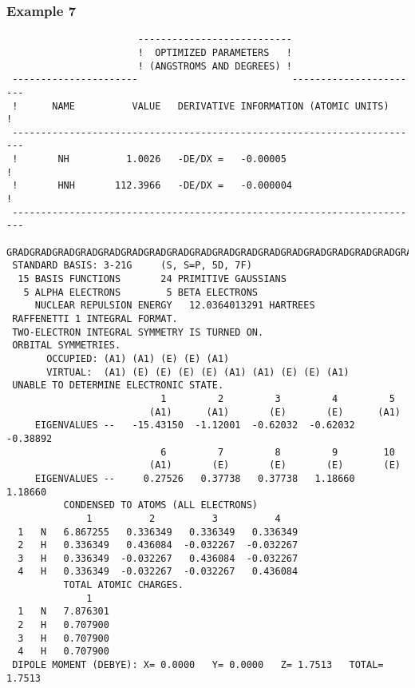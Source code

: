 \subsubsection{\sf Example 7}
{\small
\begin{verbatim}
                       ---------------------------
                       !  OPTIMIZED PARAMETERS   !
                       ! (ANGSTROMS AND DEGREES) !
 ----------------------                           -----------------------
 !      NAME          VALUE   DERIVATIVE INFORMATION (ATOMIC UNITS)     !
 ------------------------------------------------------------------------
 !       NH          1.0026   -DE/DX =   -0.00005                       !
 !       HNH       112.3966   -DE/DX =   -0.000004                      !
 ------------------------------------------------------------------------
 GRADGRADGRADGRADGRADGRADGRADGRADGRADGRADGRADGRADGRADGRADGRADGRADGRADGRAD
 STANDARD BASIS: 3-21G     (S, S=P, 5D, 7F)
  15 BASIS FUNCTIONS       24 PRIMITIVE GAUSSIANS
   5 ALPHA ELECTRONS        5 BETA ELECTRONS
     NUCLEAR REPULSION ENERGY   12.0364013291 HARTREES
 RAFFENETTI 1 INTEGRAL FORMAT.
 TWO-ELECTRON INTEGRAL SYMMETRY IS TURNED ON.
 ORBITAL SYMMETRIES.
       OCCUPIED: (A1) (A1) (E) (E) (A1)
       VIRTUAL:  (A1) (E) (E) (E) (E) (A1) (A1) (E) (E) (A1)
 UNABLE TO DETERMINE ELECTRONIC STATE.
                           1         2         3         4         5
                         (A1)      (A1)       (E)       (E)      (A1)
     EIGENVALUES --   -15.43150  -1.12001  -0.62032  -0.62032  -0.38892
                           6         7         8         9        10
                         (A1)       (E)       (E)       (E)       (E)
     EIGENVALUES --     0.27526   0.37738   0.37738   1.18660   1.18660
          CONDENSED TO ATOMS (ALL ELECTRONS)
              1          2          3          4
  1   N   6.867255   0.336349   0.336349   0.336349
  2   H   0.336349   0.436084  -0.032267  -0.032267
  3   H   0.336349  -0.032267   0.436084  -0.032267
  4   H   0.336349  -0.032267  -0.032267   0.436084
          TOTAL ATOMIC CHARGES.
              1
  1   N   7.876301
  2   H   0.707900
  3   H   0.707900
  4   H   0.707900
 DIPOLE MOMENT (DEBYE): X= 0.0000   Y= 0.0000   Z= 1.7513   TOTAL= 1.7513
\end{verbatim}
}
\newpage
